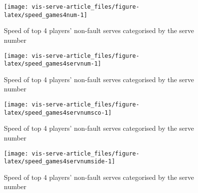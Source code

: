 \documentclass[article]{jss}
\begin{document}
\begin{CodeChunk}
\begin{figure}

{\centering \texttt{[image: vis-serve-article\_files/figure-latex/speed\_games4num-1]} 

}

\caption[Speed of top 4 players' non-fault serves categorised by the serve number]{Speed of top 4 players' non-fault serves categorised by the serve number}\label{fig:speed_games4num}
\end{figure}
\end{CodeChunk}

\begin{CodeChunk}
\begin{figure}

{\centering \texttt{[image: vis-serve-article\_files/figure-latex/speed\_games4servnum-1]} 

}

\caption[Speed of top 4 players' non-fault serves categorised by the serve number]{Speed of top 4 players' non-fault serves categorised by the serve number}\label{fig:speed_games4servnum}
\end{figure}
\end{CodeChunk}

\begin{CodeChunk}
\begin{figure}

{\centering \texttt{[image: vis-serve-article\_files/figure-latex/speed\_games4servnumsco-1]} 

}

\caption[Speed of top 4 players' non-fault serves categorised by the serve number]{Speed of top 4 players' non-fault serves categorised by the serve number}\label{fig:speed_games4servnumsco}
\end{figure}
\end{CodeChunk}

\begin{CodeChunk}
\begin{figure}

{\centering \texttt{[image: vis-serve-article\_files/figure-latex/speed\_games4servnumside-1]} 

}

\caption[Speed of top 4 players' non-fault serves categorised by the serve number]{Speed of top 4 players' non-fault serves categorised by the serve number}\label{fig:speed_games4servnumside}
\end{figure}
\end{CodeChunk}
\end{document}

